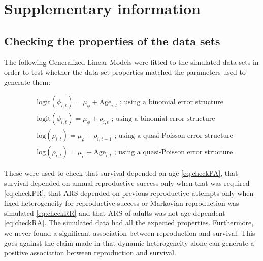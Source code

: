 
\newpage
\section{Supplementary information}

\subsection{Checking the properties of the data sets}\label{ap:chpro}
The following Generalized Linear Models were fitted to the simulated data sets in order to test whether the data set properties matched the parameters used to generate them:

\begin{subequations}\label{eq:check}
\begin{align}
&\mathrm{logit}(\phi_{i,t})=\mu_{\phi}+\mathrm{Age}_{i,t}\label{eq:checkPA}\text{ ; using a binomial error structure}\\
&\mathrm{logit}(\phi_{i,t})=\mu_{\phi}+\rho_{i,t}\label{eq:checkPR}\text{ ; using a binomial error structure}\\
&\mathrm{log}(\rho_{i,t}) =\mu_{\rho}+ \rho_{i,t-1}\label{eq:checkRR}\text{ ; using a quasi-Poisson error structure}\\
&\mathrm{log}(\rho_{i,t}) =\mu_{\rho}+ \mathrm{Age}_{i,t}\label{eq:checkRA}\text{ ; using a quasi-Poisson error structure}
\end{align}
\end{subequations}

These were used to check that survival depended on age \eqref{eq:checkPA}, that survival depended on annual reproductive success only when that was required \eqref{eq:checkPR}, that ARS depended on previous reproductive attempts only when fixed heterogeneity for reproductive success or Markovian reproduction was simulated \eqref{eq:checkRR} and that ARS of adults was not age-dependent \eqref{eq:checkRA}. The simulated data had all the expected properties. Furthermore, we never found a significant association between reproduction and survival. This goes against the claim made in \cite{Steiner2010} that dynamic heterogeneity alone can generate a positive association between reproduction and survival.

